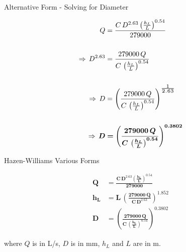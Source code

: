 \documentclass[9pt,xcolor={svgnames, x11names},mathpazo, professionalfonts]{beamer}
\begin{document}
\begin{frame}{Alternative Form - Solving for Diameter}
	
	\begin{align*}
		Q                     & = \frac{C\,D^{2.63}\left(\frac{h_L}{L}\right)^{0.54}}{279000}                                             \\\\
		\Rightarrow\,D^{2.63} & = \frac{279000\,Q}{C\,\left(\frac{h_L}{L}\right)^{0.54}}                                                  \\\\
		\Rightarrow\,D        & = \left(\frac{279000\,Q}{C\,\left(\frac{h_L}{L}\right)^{0.54}}\right)^{\scaleto{\frac{1}{2.63}}{1.125em}} \\\\
		\Rightarrow\,\bm{D}   & \bm{= \left(\frac{279000\,Q}{C\,\left(\frac{h_L}{L}\right)^{0.54}}\right)^{0.3802}}                       
	\end{align*}
\end{frame}


\begin{frame}{Hazen-Williams Various Forms}
	\centering
	\begin{mybox}[title=Hazen-Williams Formul\ae, width=0.8\textwidth]{}{}
		\begin{align*}
			\bm{Q}   & \bm{= \frac{C\,D^{2.63}\left(\frac{h_L}{L}\right)^{0.54}}{279000}}                  \\
			\bm{h_L} & \bm{= L\,\left(\frac{279000\,Q}{C\,D^{2.63}}\right)^{1.852}}                        \\
			\bm{D}   & \bm{= \left(\frac{279000\,Q}{C\,\left(\frac{h_L}{L}\right)^{0.54}}\right)^{0.3802}} 
		\end{align*}
		\par\centering
		where $Q$ is in L/s, $D$ is in mm, $h_L$ and $L$ are in m.
		\par\medskip
		
	\end{mybox}
	
	
	
\end{frame}


\end{document}
